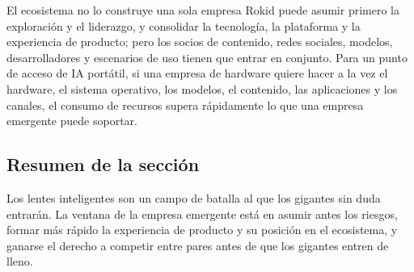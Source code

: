 \begin{importantbox}{El ecosistema no lo construye una sola empresa}
Rokid puede asumir primero la exploración y el liderazgo, y consolidar la tecnología, la plataforma y la experiencia de producto; pero los socios de contenido, redes sociales, modelos, desarrolladores y escenarios de uso tienen que entrar en conjunto. Para un punto de acceso de IA portátil, si una empresa de hardware quiere hacer a la vez el hardware, el sistema operativo, los modelos, el contenido, las aplicaciones y los canales, el consumo de recursos supera rápidamente lo que una empresa emergente puede soportar.
\end{importantbox}

\subsection{Resumen de la sección}

Los lentes inteligentes son un campo de batalla al que los gigantes sin duda entrarán. La ventana de la empresa emergente está en asumir antes los riesgos, formar más rápido la experiencia de producto y su posición en el ecosistema, y ganarse el derecho a competir entre pares antes de que los gigantes entren de lleno.
